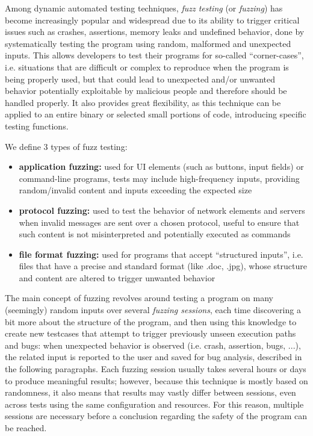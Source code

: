 Among dynamic automated testing techniques, \textit{fuzz testing} (or \textit{fuzzing}) has become increasingly popular and widespread due to its ability to trigger critical issues such as crashes, assertions, memory leaks and undefined behavior, done by systematically testing the program using random, malformed and unexpected inputs. This allows developers to test their programs for so-called ``corner-cases'', i.e. situations that are difficult or complex to reproduce when the program is being properly used, but that could lead to unexpected and/or unwanted behavior potentially exploitable by malicious people and therefore should be handled properly. It also provides great flexibility, as this technique can be applied to an entire binary or selected small portions of code, introducing specific testing functions.

\newpage
We define 3 types of fuzz testing:
\begin{itemize}
    \item \textbf{application fuzzing:} used for UI elements (such as buttons, input fields) or command-line programs, tests may include high-frequency inputs, providing random/invalid content and inputs exceeding the expected size
    \item \textbf{protocol fuzzing:} used to test the behavior of network elements and servers when invalid messages are sent over a chosen protocol, useful to ensure that such content is not misinterpreted and potentially executed as commands
    \item \textbf{file format fuzzing:} used for programs that accept ``structured inputs'', i.e. files that have a precise and standard format (like .doc, .jpg), whose structure and content are altered to trigger unwanted behavior
\end{itemize}

The main concept of fuzzing revolves around testing a program on many (seemingly) random inputs over several \textit{fuzzing sessions}, each time discovering a bit more about the structure of the program, and then using this knowledge to create new testcases that attempt to trigger previously unseen execution paths and bugs: when unexpected behavior is observed (i.e. crash, assertion, bugs, ...), the related input is reported to the user and saved for bug analysis, described in the following paragraphs. 
Each fuzzing session usually takes several hours or days to produce meaningful results; however, because this technique is mostly based on randomness, it also means that results may vastly differ between sessions, even across tests using the same configuration and resources. For this reason, multiple sessions are necessary before a conclusion regarding the safety of the program can be reached.

